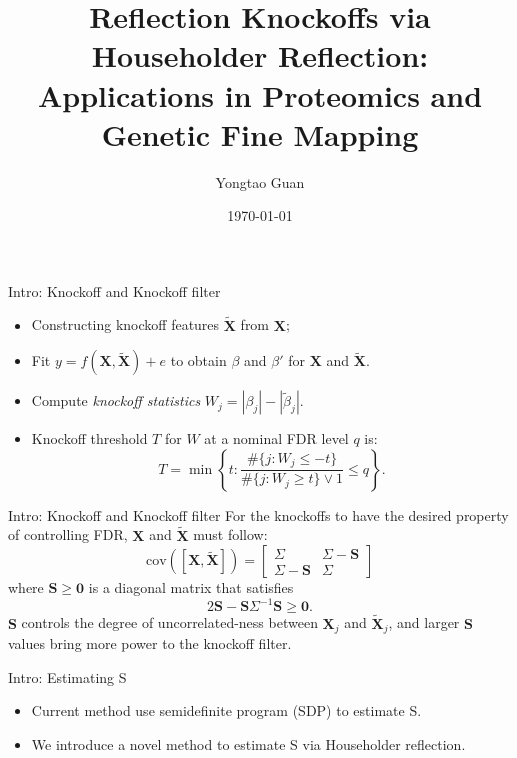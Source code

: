 \documentclass[]{beamer}
\title[ReKo]{Reflection Knockoffs via Householder Reflection: Applications in Proteomics and Genetic Fine Mapping}
\author{Yongtao Guan}
\institute[]%
{
Framingham Heart Study \\
National Heart, Lung, and Blood Institute  %

}
\date{\today}
\def\0{{\mathbf{0}}}
\def\tX{{\mathbf{\tilde{X}}}}
\def\X{{\mathbf{X}}}
\def\S{{\mathbf{S}}}
\def\cov{{\textrm{cov}}}
\begin{document}
\frame{\titlepage}

\begin{frame}{Intro: Knockoff and Knockoff filter}
\begin{itemize}
\item Constructing knockoff features $\tX$ from $\X$;  
\item Fit $y = f(\X, \tX) + e$ to obtain $\beta$ and $\beta'$ for $\X$ and $\tX$. 
\item Compute \emph{knockoff statistics} $W_j = |\beta_j| - |\tilde\beta_j|$. 
\item Knockoff threshold $T$ for $W$ at a nominal FDR level $q$ is:  
\begin{equation}\label{knockoff.threshold}
T=\min\left\{t: \frac{\#\{j: W_j \le -t\}}{\#\{j: W_j \ge t\}  \vee 1} \le q \right\}.
\end{equation}

\end{itemize}
\end{frame}

\begin{frame}{Intro: Knockoff and Knockoff filter}
For the knockoffs to have the desired property of controlling FDR, $\X$ and $\tX$ must follow:  
\begin{equation}\label{intro.cov}
\cov\left([\X, \tX]\right) = \begin{bmatrix} \Sigma & \Sigma-\S \\ \Sigma-\S & \Sigma \end{bmatrix}
\end{equation}
where $\S\ge\0$ is a diagonal matrix that satisfies 
\begin{equation}\label{intro.cond}
2\S - \S\Sigma^{-1}\S \ge \0. 
\end{equation}
$\S$ controls the degree of uncorrelated-ness between $\X_j$ and $\tX_j$, and larger $\S$ values bring more power to the knockoff filter. 
\end{frame}


\begin{frame}{Intro: Estimating S}
\begin{itemize}
\item Current method use semidefinite program (SDP) to estimate S. 
\item We introduce a novel method to estimate S via Householder reflection. 
\end{itemize}

\end{frame}
\end{document}
